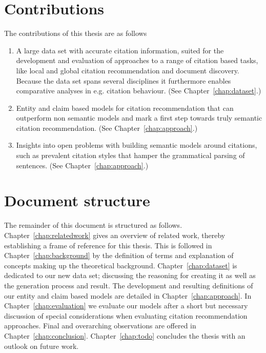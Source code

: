\section{Contributions}\label{sec:contributions}
The contributions of this thesis are as follows
\begin{enumerate}
\item A large data set with accurate citation information, suited for the development and evaluation of approaches to a range of citation based tasks, like local and global citation recommendation and document discovery. Because the data set spans several disciplines it furthermore enables comparative analyses in e.g. citation behaviour. (See Chapter~\ref{chap:dataset}.)
\item Entity and claim based models for citation recommendation that can outperform non semantic models and mark a first step towards truly semantic citation recommendation. (See Chapter~\ref{chap:approach}.)
\item Insights into open problems with building semantic models around citations, such as prevalent citation styles that hamper the grammatical parsing of sentences. (See Chapter~\ref{chap:approach}.)
\end{enumerate}

\section{Document structure}\label{sec:documentstructure}
The remainder of this document is structured as follows. Chapter~\ref{chap:relatedwork} gives an overview of related work, thereby establishing a frame of reference for this thesis. This is followed in Chapter~\ref{chap:background} by the definition of terms and explanation of concepts making up the theoretical background. Chapter~\ref{chap:dataset} is dedicated to our new data set; discussing the reasoning for creating it as well as the generation process and result. The development and resulting definitions of our entity and claim based models are detailed in Chapter~\ref{chap:approach}. In Chapter~\ref{chap:evaluation} we evaluate our models after a short but necessary discussion of special considerations when evaluating citation recommendation approaches. Final and overarching observations are offered in Chapter~\ref{chap:conclusion}. Chapter~\ref{chap:todo} concludes the thesis with an outlook on future work.
